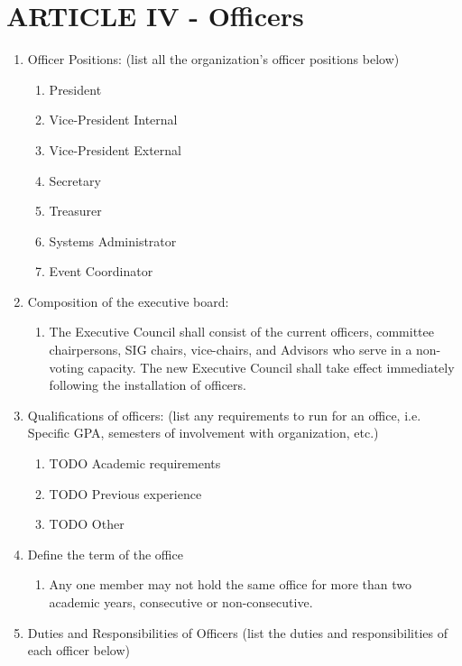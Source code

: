 \documentclass[11pt,a4paper,notitlepage]{article}
\begin{document}
\section*{ARTICLE IV - Officers}
\begin{enumerate}[label=\Alph*.]
  \item Officer Positions: (list all the organization’s officer positions below)
    \begin{enumerate}[label=\arabic*.]
      \item President
      \item Vice-President Internal
      \item Vice-President External
      \item Secretary
      \item Treasurer
      \item Systems Administrator
      \item Event Coordinator
    \end{enumerate}
  \item Composition of the executive board:
    \begin{enumerate}[label=\arabic*.]
      \item The Executive Council shall consist of the current officers, committee chairpersons, SIG chairs, vice-chairs, and Advisors who serve in a non-voting capacity. The new Executive Council shall take effect immediately following the installation of officers.
    \end{enumerate}
  \item Qualifications of officers: (list any requirements to run for an office, i.e. Specific GPA, semesters of involvement with organization, etc.)
    \begin{enumerate}[label=\arabic*.]
      \item TODO Academic requirements
      \item TODO Previous experience
      \item TODO Other
    \end{enumerate}
  \item Define the term of the office
    \begin{enumerate}[label=\arabic*.]
      \item Any one member may not hold the same office for more than two academic years, consecutive or non-consecutive.
    \end{enumerate}
  \item Duties and Responsibilities of Officers (list the duties and responsibilities of each officer below)

\end{enumerate}
\end{document}
